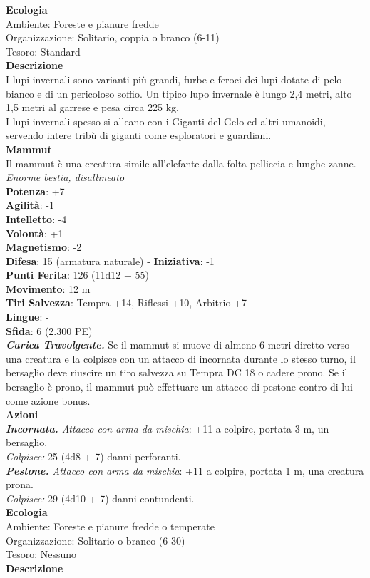 \begin{multicols}{2}
\textbf{Ecologia}\\
Ambiente: Foreste e pianure fredde\\
Organizzazione: Solitario, coppia o branco (6-11)\\
Tesoro: Standard\\
\textbf{Descrizione}\\
I lupi invernali sono varianti più grandi, furbe e feroci dei lupi dotate di pelo bianco e di un pericoloso soffio. Un tipico lupo invernale è lungo 2,4 metri, alto 1,5 metri al garrese e pesa circa 225 kg.\\
I lupi invernali spesso si alleano con i Giganti del Gelo ed altri umanoidi, servendo intere tribù di giganti come esploratori e guardiani.\\

\medskip\textbf{Mammut}\\
Il mammut è una creatura simile all'elefante dalla folta pelliccia e lunghe zanne.\\
\emph{Enorme bestia, disallineato}\\
\textbf{Potenza}: +7\\
\textbf{Agilità}: -1\\
\textbf{Intelletto}: -4\\
\textbf{Volontà}: +1\\
\textbf{Magnetismo}: -2\\
\textbf{Difesa}: 15 (armatura naturale) - \textbf{Iniziativa}: -1\\
\textbf{Punti Ferita}: 126 (11d12 + 55)\\
\textbf{Movimento}: 12 m\\
\textbf{Tiri Salvezza}: Tempra +14, Riflessi +10, Arbitrio +7 \\
\textbf{Lingue}: -\\
\textbf{Sfida}: 6 (2.300 PE)\smallskip\\
\emph{\textbf{Carica Travolgente.}} Se il mammut si muove di almeno 6 metri diretto verso una creatura e la colpisce con un attacco di incornata durante lo stesso turno, il bersaglio deve riuscire un tiro salvezza su Tempra DC 18 o cadere prono. Se il bersaglio è prono, il mammut può effettuare un attacco di pestone contro di lui come azione bonus.\\
\smallskip\textbf{Azioni}\\
\emph{\textbf{Incornata.} Attacco con arma da mischia}: +11 a colpire, portata 3 m, un bersaglio.\\
\emph{Colpisce:} 25 (4d8 + 7) danni perforanti.\\
\emph{\textbf{Pestone.} Attacco con arma da mischia}: +11 a colpire, portata 1 m, una creatura prona.\\
\emph{Colpisce:} 29 (4d10 + 7) danni contundenti.\\
\textbf{Ecologia}\\
Ambiente: Foreste e pianure fredde o temperate\\
Organizzazione: Solitario o branco (6-30)\\
Tesoro: Nessuno\\
\textbf{Descrizione}\\


\end{multicols}
